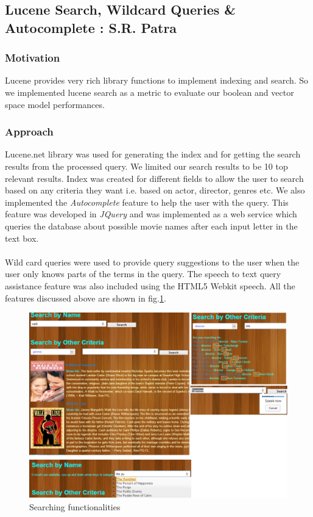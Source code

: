 \subsection{Lucene Search, Wildcard Queries \& Autocomplete : S.R. Patra}
\subsubsection{Motivation}
Lucene provides very rich library functions to implement indexing and search. So we implemented lucene search as a metric to evaluate our boolean and vector space model performances. 
\subsubsection{Approach}
Lucene.net library\cite{lucene} was used for generating the index and for getting the search results from the processed query. We limited our search results to be 10 top relevant results. Index was created for different fields to allow the user to search based on any criteria they want i.e. based on actor, director, genres etc. We also implemented the \textit{Autocomplete} feature to help the user with the query. This feature was developed in \textit{JQuery}\cite{jquery} and was implemented as a web service which queries the database about possible movie names after each input letter in the text box. 

\paragraph{}
Wild card queries\cite{wildcard} were used to provide query suggestions to the user when the user only knows parts of the terms in the query. The speech to text query assistance feature was also included using the HTML5 Webkit speech. All the features discussed above are shown in fig.\ref{fig:search}.
\begin{figure}[H]
    \centering
    \includegraphics[width=4.5in]{search.png}
    \caption{Searching functionalities}
    \label{fig:search}
\end{figure}

